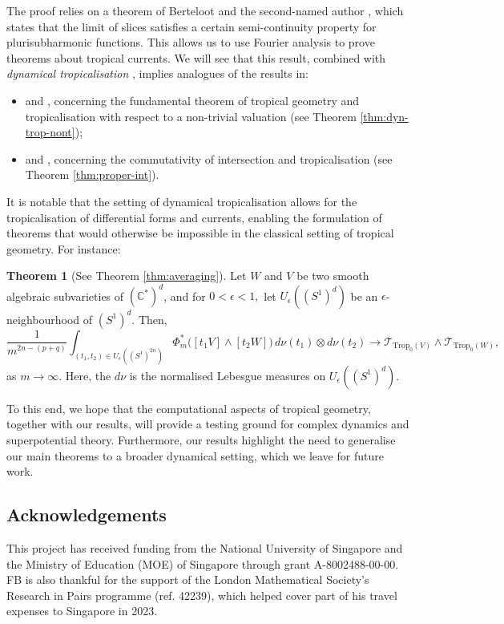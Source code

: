 \documentclass[11pt]{amsart}
\theoremstyle{definition}
\newcommand{\C}{\mathbb{C}}
\newcommand{\sT}{\mathscr{T}}
\newcommand{\Trop}{\mathrm{Trop}}
\newtheorem{itheorem}{Theorem}
\begin{document}
The proof relies on a theorem of Berteloot and the second-named author \cite{Berteloot--Dinh}, which states that the limit of slices satisfies a certain semi-continuity property for plurisubharmonic functions. This allows us to use Fourier analysis to prove theorems about tropical currents. We will see that this result, combined with \emph{dynamical tropicalisation} \cite{Dyn-trop}, implies analogues of the results in:
\begin{itemize}
    \item \cite{Jonsson} and \cite{Maclagan-Sturmfels}, concerning the fundamental theorem of tropical geometry and tropicalisation with respect to a non-trivial valuation (see Theorem \ref{thm:dyn-trop-nont});
    \item \cite{BJSST} and \cite{Osserman-Payne}, concerning the commutativity of intersection and tropicalisation (see Theorem \ref{thm:proper-int}).
\end{itemize}

\vskip 2mm
  It is notable that the setting of dynamical tropicalisation allows for the tropicalisation of differential forms and currents, enabling the formulation of theorems that would otherwise be impossible in the classical setting of tropical geometry. For instance:
\begin{itheorem}[See Theorem \ref{thm:averaging}]
    Let $W$ and $V$ be two smooth algebraic subvarieties of $(\C^*)^d$, and for $0<\epsilon <1,$ let $U_{\epsilon}((S^1)^d)$ be an $\epsilon$-neighbourhood of  $(S^1)^d.$ Then,
    $$
    \frac{1}{m^{2n-(p+q)}} \int_{(t_1, t_2)\in   U_{\epsilon}((S^1)^{2n})}\Phi_m^*\big( [t_1 V] \wedge [t_2 W] \big)\, d\nu(t_1) \otimes d\nu(t_2) \longrightarrow \sT_{\Trop_0(V)} \wedge \sT_{\Trop_0(W)},
    $$
    as $m \to \infty$. Here, the $d\nu$ is the normalised Lebesgue measures on $U_{\epsilon}((S^1)^d)$. 
\end{itheorem}
To this end, we hope that the computational aspects of tropical geometry, together with our results, will provide a testing ground for complex dynamics and superpotential theory. Furthermore, our results highlight the need to generalise our main theorems to a broader dynamical setting, which we leave for future work.

\subsection*{Acknowledgements}
This project has received funding from the National University of Singapore and the Ministry of Education (MOE) of Singapore through grant A-8002488-00-00. FB is also thankful for the support of the London Mathematical Society’s Research in Pairs programme (ref. 42239), which helped cover part of his travel expenses to Singapore in 2023.
\end{document}
